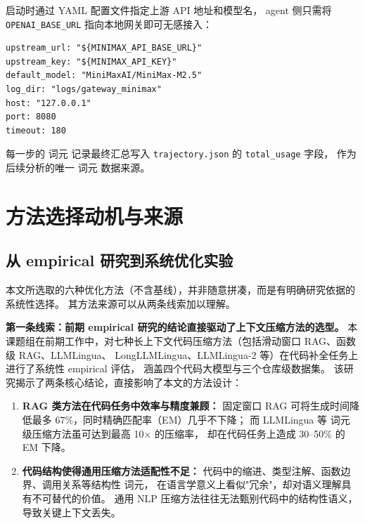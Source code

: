 启动时通过 YAML 配置文件指定上游 API 地址和模型名，
agent 侧只需将 \texttt{OPENAI\_BASE\_URL} 指向本地网关即可无感接入：

\begin{lstlisting}[style=promptstyle, caption={网关配置文件示例}, label={lst:gateway-config}]
upstream_url: "${MINIMAX_API_BASE_URL}"
upstream_key: "${MINIMAX_API_KEY}"
default_model: "MiniMaxAI/MiniMax-M2.5"
log_dir: "logs/gateway_minimax"
host: "127.0.0.1"
port: 8080
timeout: 180
\end{lstlisting}

每一步的 词元 记录最终汇总写入 \texttt{trajectory.json} 的 \texttt{total\_usage} 字段，
作为后续分析的唯一 词元 数据来源。


\section{方法选择动机与来源}
\label{sec:method-motivation}

\subsection{从 empirical 研究到系统优化实验}
\label{subsec:empirical-motivation}

本文所选取的六种优化方法（不含基线），并非随意拼凑，而是有明确研究依据的系统性选择。
其方法来源可以从两条线索加以理解。

\textbf{第一条线索：前期 empirical 研究的结论直接驱动了上下文压缩方法的选型。}
本课题组在前期工作中，对七种长上下文代码压缩方法（包括滑动窗口 RAG、函数级 RAG、LLMLingua、
LongLLMLingua、LLMLingua-2 等）在代码补全任务上进行了系统性 empirical 评估，
涵盖四个代码大模型与三个仓库级数据集。
该研究揭示了两条核心结论，直接影响了本文的方法设计：

\begin{enumerate}
\item \textbf{RAG 类方法在代码任务中效率与精度兼顾：}
固定窗口 RAG 可将生成时间降低最多 67\%，同时精确匹配率（EM）几乎不下降；
而 LLMLingua 等 词元 级压缩方法虽可达到最高 10$\times$ 的压缩率，
却在代码任务上造成 30--50\% 的 EM 下降。
\item \textbf{代码结构使得通用压缩方法适配性不足：}
代码中的缩进、类型注解、函数边界、调用关系等结构性 词元，
在语言学意义上看似"冗余"，却对语义理解具有不可替代的价值。
通用 NLP 压缩方法往往无法甄别代码中的结构性语义，导致关键上下文丢失。
\end{enumerate}

